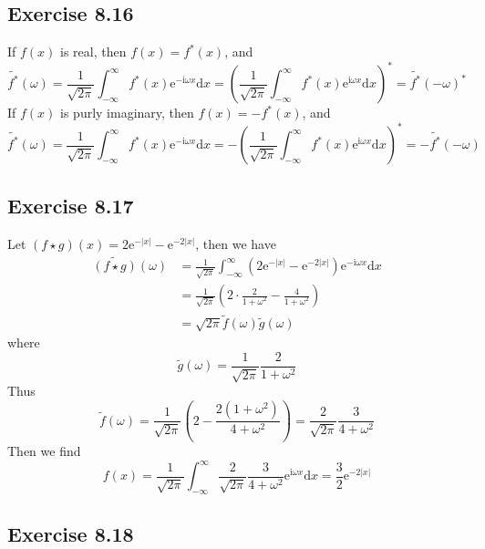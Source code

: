 \documentclass[]{ctexart}
\begin{document}
\subsection{Exercise 8.16}
If $f(x)$ is real, then $f(x)=f^*(x)$, and 
\begin{equation*}
\widetilde{f^*}(\omega)=\frac{1}{\sqrt{2\pi}}\int_{-\infty}^\infty f^*(x)\mathrm{e}^{-\mathrm{i}\omega x}\mathrm{d}x=\left(\frac{1}{\sqrt{2\pi}}\int_{-\infty}^\infty f^*(x)\mathrm{e}^{\mathrm{i}\omega x}\mathrm{d}x\right)^*=\widetilde{f^*}(-\omega)^*
\end{equation*}
If $f(x)$ is purly imaginary, then $f(x)=-f^*(x)$, and 
\begin{equation*}
\widetilde{f^*}(\omega)=\frac{1}{\sqrt{2\pi}}\int_{-\infty}^\infty f^*(x)\mathrm{e}^{-\mathrm{i}\omega x}\mathrm{d}x=-\left(\frac{1}{\sqrt{2\pi}}\int_{-\infty}^\infty f^*(x)\mathrm{e}^{\mathrm{i}\omega x}\mathrm{d}x\right)^*=-\widetilde{f^*}(-\omega)
\end{equation*}

\subsection{Exercise 8.17}
Let $(f\star g)(x)=2\mathrm{e}^{-|x|}-\mathrm{e}^{-2|x|}$, then we have 
\begin{align*}
\widetilde{(f\star g)}(\omega)&=\frac{1}{\sqrt{2\pi}}\int_{-\infty}^\infty\left(2\mathrm{e}^{-|x|}-\mathrm{e}^{-2|x|}\right)\mathrm{e}^{-\mathrm{i}\omega x}\mathrm{d}x\\
&=\frac{1}{\sqrt{2\pi}}\left(2\cdot\frac{2}{1+\omega^2}-\frac{4}{1+\omega^2}\right)\\
&=\sqrt{2\pi}\tilde{f}(\omega)\tilde{g}(\omega)
\end{align*}
where 
\begin{equation*}
\tilde{g}(\omega)=\frac{1}{\sqrt{2\pi}}\frac{2}{1+\omega^2}
\end{equation*}
Thus 
\begin{equation*}
\tilde{f}(\omega)=\frac{1}{\sqrt{2\pi}}\left(2-\frac{2(1+\omega^2)}{4+\omega^2}\right)=\frac{2}{\sqrt{2\pi}}\frac{3}{4+\omega^2}
\end{equation*}
Then we find 
\begin{equation*}
f(x)=\frac{1}{\sqrt{2\pi}}\int_{-\infty}^\infty\frac{2}{\sqrt{2\pi}}\frac{3}{4+\omega^2}\mathrm{e}^{\mathrm{i}\omega x}\mathrm{d}x=\frac{3}{2}\mathrm{e}^{-2|x|}
\end{equation*}
\subsection{Exercise 8.18}
\end{document}
